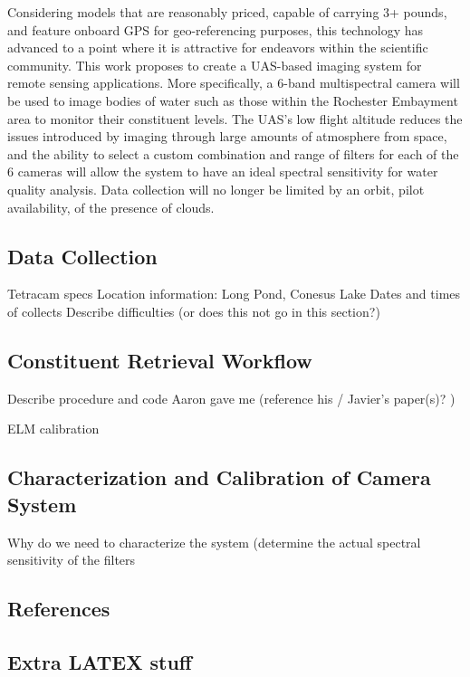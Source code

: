 \documentclass[12pt, letterpaper, oneside, onecolumn]{article}
\begin{document}
Considering models that are reasonably priced, capable of carrying 3+ pounds, and feature onboard GPS for geo-referencing purposes, this technology has advanced to a point where it is attractive for endeavors within the scientific community. This work proposes to create a UAS-based imaging system for remote sensing applications. More specifically, a 6-band multispectral camera will be used to image bodies of water such as those within the Rochester Embayment area to monitor their constituent levels. The UAS’s low flight altitude reduces the issues introduced by imaging through large amounts of atmosphere from space, and the ability to select a custom combination and range of filters for each of the 6 cameras will allow the system to have an ideal spectral sensitivity for water quality analysis. Data collection will no longer be limited by an orbit, pilot availability, of the presence of clouds.



\subsection{Data Collection}

Tetracam specs 
Location information: Long Pond, Conesus Lake 
Dates and times of collects 
Describe difficulties (or does this not go in this section?) 

\subsection{Constituent Retrieval Workflow}

Describe procedure and code Aaron gave me (reference his / Javier's paper(s)? ) 

ELM calibration 



\subsection{Characterization and Calibration of Camera System}

Why do we need to characterize the system (determine the actual spectral sensitivity of the filters 


\subsection{References}


\subsection{Extra LATEX stuff}
\end{document}
